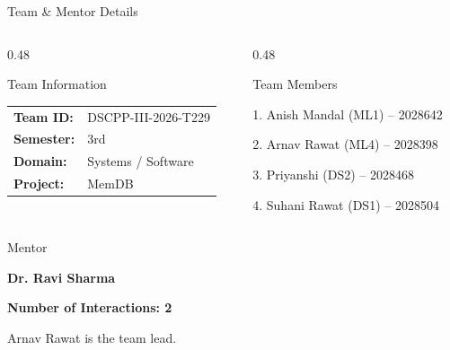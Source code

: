 \documentclass[aspectratio=169,10pt]{beamer}
\begin{document}

\begin{frame}{Team \& Mentor Details}

\begin{columns}[T]

\begin{column}{0.48\textwidth}

\begin{block}{Team Information}

\begin{tabular}{@{}ll@{}}

\textbf{Team ID:} & DSCPP-III-2026-T229 \\[2mm]

\textbf{Semester:} & 3rd \\[2mm]

\textbf{Domain:} & Systems / Software \\[2mm]

\textbf{Project:} & MemDB

\end{tabular}

\end{block}

\end{column}

\begin{column}{0.48\textwidth}

\begin{block}{Team Members}

\small

1. Anish Mandal (ML1) -- 2028642

\vspace{2mm}

2. Arnav Rawat (ML4) -- 2028398

\vspace{2mm}

3. Priyanshi (DS2) -- 2028468

\vspace{2mm}

4. Suhani Rawat (DS1) -- 2028504

\end{block}

\end{column}

\end{columns}

\vspace{3mm}

\begin{block}{Mentor}

\textbf{Dr. Ravi Sharma}

\hfill

\textbf{Number of Interactions: 2}

\end{block}

\vspace{2mm}

\small
\textcolor{GEUGrey}{
Arnav Rawat is the team lead.
}

\end{frame}
\end{document}
